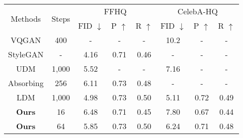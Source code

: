 \documentclass[10pt,twocolumn,letterpaper]{article}
\begin{document}
\begin{table}[]
{\begin{tabular}{c|c| ccc | ccc }
    
    \midrule
    \midrule
    
    \multirow{2}{*}{Methods} & \multirow{2}{*}{Steps} &     \multicolumn{3}{c|}{FFHQ} & \multicolumn{3}{c}{CelebA-HQ} \\
         & & FID $\downarrow$ & P $\uparrow$ & R $\uparrow$ & FID $\downarrow$ & P $\uparrow$ & R $\uparrow$ \\
    \midrule
    VQGAN & 400 & - & - & - & 10.2 & - & - \\
    StyleGAN \cite{stylegan} & - & 4.16 & 0.71 & 0.46 & - & - & -\\
    UDM \cite{udm} & 1,000 & 5.52 & - & - & 7.16 & - & - \\
    Absorbing \cite{unleashing} & 256 & 6.11 & 0.73 & 0.48 & - & - & -\\
    LDM \cite{latent} & 1,000 & 4.98 & 0.73 & 0.50 & 5.11 & 0.72 & 0.49 \\
    \textbf{Ours} & 16 & 6.48 & 0.71 & 0.45 & 7.80 & 0.67 & 0.44\\
    \textbf{Ours} & 64 & 5.85 & 0.73 & 0.50 & 6.24 & 0.71 & 0.48 \\
         
    \midrule
    \end{tabular}}
\end{table}

    
      
\end{document}
